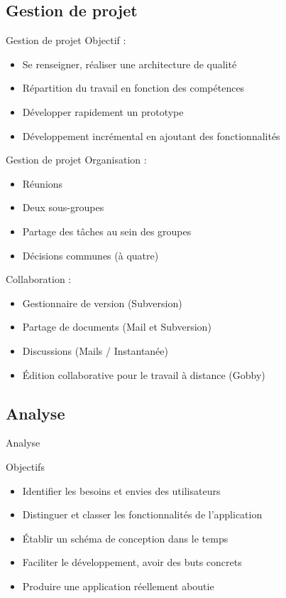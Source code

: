 \documentclass{beamer}
\begin{document}
	\subsection{Gestion de projet}
		\begin{frame}{Gestion de projet}
			Objectif :
			\begin{itemize}
			\item Se renseigner, réaliser une architecture de qualité
			\item Répartition du travail en fonction des compétences
			\item Développer rapidement un prototype
			\item Développement incrémental en ajoutant des fonctionnalités
			\end{itemize} 
		\end{frame}
		
		\begin{frame}{Gestion de projet}
		Organisation :
			\begin{itemize}
				\item{Réunions}
				\item{Deux sous-groupes}
				\item{Partage des tâches au sein des groupes}
				\item{Décisions communes (à quatre)}
			\end{itemize}
		
		Collaboration :
			\begin{itemize}
				\item{Gestionnaire de version (Subversion)}
				\item{Partage de documents (Mail et Subversion)}
				\item{Discussions (Mails / Instantanée)}
				\item{Édition collaborative pour le travail à distance (Gobby)}
			\end{itemize}
		\end{frame}
		
	\subsection{Analyse}
		\begin{frame}{Analyse}
			\begin{exampleblock}{Objectifs}
				\begin{itemize}
					\item{Identifier les besoins et envies des utilisateurs}
					\item{Distinguer et classer les fonctionnalités de l'application}
					\item{Établir un schéma de conception dans le temps}
					\item{Faciliter le développement, avoir des buts concrets}
					\item{Produire une application réellement aboutie}
				\end{itemize}
			\end{exampleblock}
		\end{frame}
	
\end{document}
